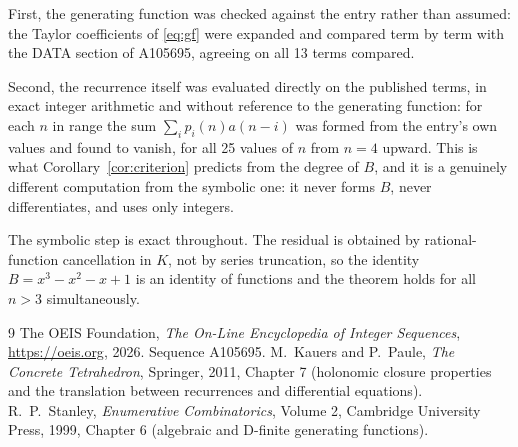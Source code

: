 \documentclass[11pt,a4paper]{article}
\theoremstyle{plain}
\theoremstyle{definition}
\begin{document}
First, the generating function was checked against the entry rather than assumed: the
Taylor coefficients of \eqref{eq:gf} were expanded and compared term by term with the DATA
section of A105695, agreeing on all 13 terms compared.

Second, the recurrence itself was evaluated directly on the published terms, in exact
integer arithmetic and without reference to the generating function: for each $n$ in range
the sum $\sum_{i}p_{i}(n)a(n-i)$ was formed from the entry's own values and found to
vanish, for all 25 values of $n$ from $n=4$ upward. This is what
Corollary~\ref{cor:criterion} predicts from the degree of $B$, and it is a genuinely
different computation from the symbolic one: it never forms $B$, never differentiates, and
uses only integers.

The symbolic step is exact throughout. The residual is obtained by rational-function
cancellation in $K$, not by series truncation, so the identity $B=x^{3} - x^{2} - x + 1$ is an
identity of functions and the theorem holds for all $n>3$ simultaneously.

\begin{thebibliography}{9}
 The OEIS Foundation, \emph{The On-Line Encyclopedia of Integer Sequences},
\url{https://oeis.org}, 2026. Sequence A105695.
 M.~Kauers and P.~Paule, \emph{The Concrete Tetrahedron}, Springer, 2011,
Chapter 7 (holonomic closure properties and the translation between recurrences and
differential equations).
 R.~P.~Stanley, \emph{Enumerative Combinatorics}, Volume 2, Cambridge
University Press, 1999, Chapter 6 (algebraic and D-finite generating functions).
\end{thebibliography}
\end{document}
